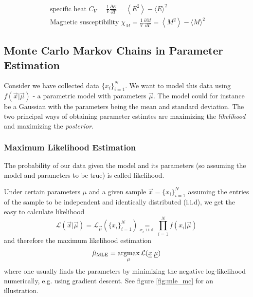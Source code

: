 \begin{equation}
    \begin{gathered}
        \text { specific heat } C_V=\frac{1}{V} \frac{\partial E}{\partial T}=\left\langle E^2\right\rangle-\langle E\rangle^2 \\
        \text { Magnetic susceptibility } \chi_M=\frac{1}{V} \frac{\partial M}{\partial T}=\left\langle M^2\right\rangle-\langle M\rangle^2
    \end{gathered}
\end{equation}

\subsection{Monte Carlo Markov Chains in Parameter Estimation}
\label{ssec:mcmc_parameter_estimation}
Consider we have collected data $\{x_i\}_{i=1}^N$.
We want to model this data using $f(\vec{x}|\vec{\mu})$ - a parametric
model with parameters $\vec{\mu}$. The model could for instance
be a Gaussian with the parameters being the mean and standard deviation.
The two principal ways of obtaining parameter estimtes are maximizing
the \textit{likelihood} and maximizing the \textit{posterior}.

\subsubsection{Maximum Likelihood Estimation}
The probability of our data given the model and its parameters (so assuming
the model and parameters to be true) is called likelihood.

Under certain parameters $\mu$ and a given sample $\vec{x} = \{x_i\}_{i=1}^N$
assuming the entries of the sample to be independent and identically
distributed (i.i.d), we get the easy to calculate likelihood
\begin{equation}
    \mathcal{L}(\vec{x}|\vec{\mu}) = \mathcal{L}_\vec{\mu}(\{x_i\}_{i=1}^N) \underset{x_i \text{ i.i.d.}}{=} \prod_{i=1}^{N} f(x_i|\vec{\mu})
\end{equation}
and therefore the maximum likelihood estimation
\begin{equation}
    \hat{\mu}_\text{MLE} = \argmax_{\mu} \mathcal{L}(\vec{x}|\vec{\mu})
\end{equation}
where one usually finds the parameters by minimizing the negative log-likelihood numerically,
e.g. using gradient descent. See figure \ref{fig:mle_mc} for an illustration.

